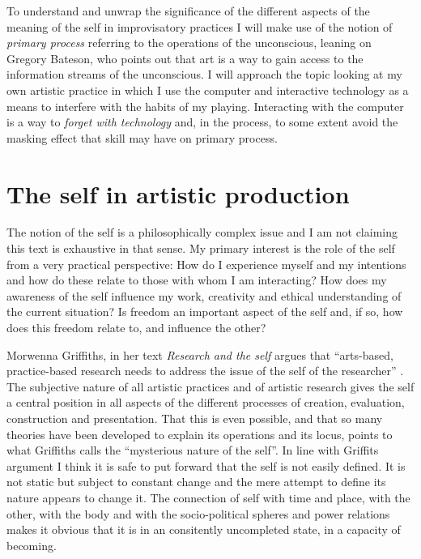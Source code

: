 \documentclass[a4paper]{article}
\begin{document}
To understand and unwrap the significance of the different aspects of the meaning of the self in improvisatory practices I will make use of the notion of \emph{primary process} referring to the operations of the unconscious, leaning on Gregory Bateson, who points out that art is a way to gain access to the information streams of the unconscious. I will approach the topic looking at my own artistic practice in which I use the computer and interactive technology as a means to interfere with the habits of my playing. Interacting with the computer is a way to \emph{forget with technology} and, in the process, to some extent avoid the masking effect that skill may have on primary process. 

\section{The self in artistic production}
\label{sec:self-artist-prod}

The notion of the self is a philosophically complex issue and I am not claiming this text is exhaustive in that sense. My primary interest is the role of the self from a very practical perspective: How do I experience myself and my intentions and how do these relate to those with whom I am interacting? How does my awareness of the self influence my work, creativity and ethical understanding of the current situation? Is freedom an important aspect of the self and, if so, how does this freedom relate to, and influence the other? 

Morwenna Griffiths, in her text \emph{Research and the self} argues that ``arts-based, practice-based research needs to address the issue of the self of the researcher'' \citep[p. 167][]{griffiths10}. The subjective nature of all artistic practices and of artistic research gives the self a central position in all aspects of the different processes of creation, evaluation, construction and presentation. That this is even possible, and that so many theories have been developed to explain its operations and its locus, points to what Griffiths calls the ``mysterious nature of the self''. In line with Griffits argument I think it is safe to put forward that the self is not easily defined. It is not static  but subject to constant change and the mere attempt to define its nature appears to change it. The connection of self with time and place, with the other, with the body and with the socio-political spheres and power relations makes it obvious that it is in an consitently uncompleted state, in a capacity of becoming.
\end{document}
